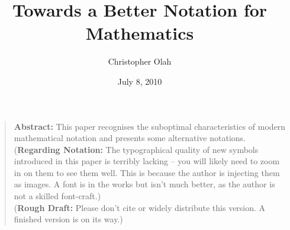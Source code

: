 



\title{Towards a Better Notation for Mathematics}
\author{Christopher Olah}
\date{July 8, 2010}



\maketitle

\begin{quotation}

{\bf Abstract:} This paper recognises the suboptimal characteristics of modern mathematical notation and presents some alternative notations.\\

({\bf Regarding Notation:} The typographical quality of new symbols introduced in this paper is terribly lacking -- you will likely need to zoom in on them to see them well. This is because the author is injecting them as images. A font is in the works but isn't much better, as the author is not a skilled font-craft.)\\

({\bf Rough Draft:} Please don't cite or widely distribute this version. A finished version is on its way.)\\

\end{quotation}

